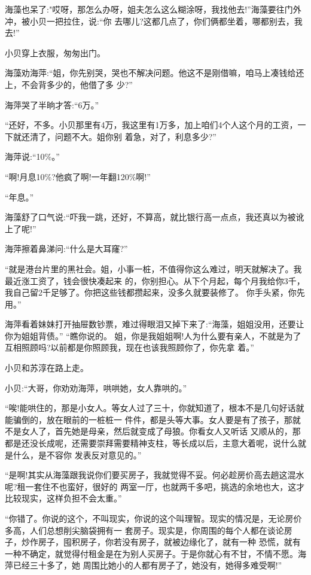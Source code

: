 \documentclass[11pt,a4paper,onecolumn]{article}
\begin{document}
海藻也呆了:"哎呀，那怎么办呀，姐夫怎么这么糊涂呀，我找他去!''海藻要往门外冲，被小贝一把拉住，说:``你
去哪儿?这都几点了，你们俩都坐着，哪都别去，我去!''

小贝穿上衣服，匆匆出门。

海藻劝海萍:``姐，你先别哭，哭也不解决问题。他这不是刚借嘛，咱马上凑钱给还上，不会背多少的，他借了多
少?''

海萍哭了半晌才答:``6万。''

``还好，不多。小贝那里有4万，我这里有1万多，加上咱们4个人这个月的工资，一下就还清了，问题不大。姐你别
着急，对了，利息多少?''

海萍说:``10\%。''

``啊!月息10\%?他疯了啊!一年翻120\%啊!''

``年息。''

海藻舒了口气说:``吓我一跳，还好，不算高，就比银行高一点点，我还真以为被讹上了呢!''

海萍擦着鼻涕问:``什么是大耳窿?''

``就是港台片里的黑社会。姐，小事一桩，不值得你这么难过，明天就解决了。我最近涨工资了，钱会很快凑起来
的，你别担心。从下个月起，每个月我给你3千，我自己留2千足够了。你把这些钱都攒起来，没多久就要装修了。
你手头紧，你先用。''

海萍看着妹妹打开抽屉数钞票，难过得眼泪又掉下来了:``海藻，姐姐没用，还要让你为姐姐背债。'' ``瞧你说的。
姐，你是我姐姐啊!人为什么要有亲人，不就是为了互相照顾吗?以前都是你照顾我，现在也该我照顾你了，你先拿
着。''

小贝和苏淳在路上走。

小贝:``大哥，你劝劝海萍，哄哄她，女人靠哄的。''

``唉!能哄住的，那是小女人。等女人过了三十，你就知道了，根本不是几句好话就能骗倒的，放在眼前的一桩桩一
件件，都是头等大事。女人要是有了孩子，那就不是女人了，首先她是母亲，然后就变成了母狼。你看女人又听话
又顺从的，那都是还没长成呢，还需要崇拜需要精神支柱，等长成以后，主意大着呢，说什么就是什么，是不容你
发表反对意见的。''

``是啊!其实从海藻跟我说你们要买房子，我就觉得不妥。何必趁房价高去趟这混水呢?租一套住不也蛮好，很好的
两室一厅，也就两千多吧，挑选的余地也大，这才比较现实，这样负担不会太重。''

``你错了。你说的这个，不叫现实，你说的这个叫理智。现实的情况是，无论房价多高，人们总想削尖脑袋拥有一
套房子。现实是，你周围的每个人都在谈论房子，炒作房子，囤积房子，你若没有房子，就被边缘化了，就有一种
恐慌，就有一种不确定，就觉得付租金是在为别人买房子。于是你就心有不甘，不情不愿。海萍已经三十多了，她
周围比她小的人都有房子了，她没有，她得多难受啊!''
\end{document}
